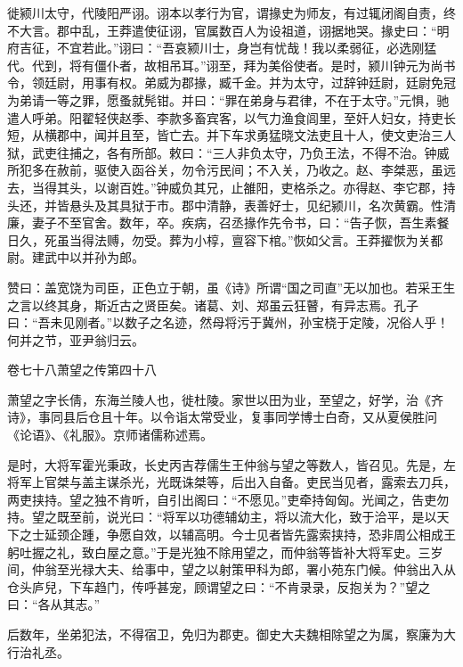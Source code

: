 \documentclass[12pt,UTF8]{ctexbook}
\begin{document}
徙颍川太守，代陵阳严诩。诩本以孝行为官，谓掾史为师友，有过辄闭阁自责，终不大言。郡中乱，王莽遣使征诩，官属数百人为设祖道，诩据地哭。掾史曰：“明府吉征，不宜若此。”诩曰：“吾哀颍川士，身岂有忧哉！我以柔弱征，必选刚猛代。代到，将有僵仆者，故相吊耳。”诩至，拜为美俗使者。是时，颍川钟元为尚书令，领廷尉，用事有权。弟威为郡掾，臧千金。并为太守，过辞钟廷尉，廷尉免冠为弟请一等之罪，愿蚤就髡钳。并曰：“罪在弟身与君律，不在于太守。”元惧，驰遣人呼弟。阳翟轻侠赵季、李款多畜宾客，以气力渔食闾里，至奸人妇女，持吏长短，从横郡中，闻并且至，皆亡去。并下车求勇猛晓文法吏且十人，使文吏治三人狱，武吏往捕之，各有所部。敕曰：“三人非负太守，乃负王法，不得不治。钟威所犯多在赦前，驱使入函谷关，勿令污民间；不入关，乃收之。赵、李桀恶，虽远去，当得其头，以谢百姓。”钟威负其兄，止雒阳，吏格杀之。亦得赵、李它郡，持头还，并皆悬头及其具狱于市。郡中清静，表善好士，见纪颍川，名次黄霸。性清廉，妻子不至官舍。数年，卒。疾病，召丞掾作先令书，曰：“告子恢，吾生素餐日久，死虽当得法赙，勿受。葬为小椁，亶容下棺。”恢如父言。王莽擢恢为关都尉。建武中以并孙为郎。



赞曰：盖宽饶为司臣，正色立于朝，虽《诗》所谓“国之司直”无以加也。若采王生之言以终其身，斯近古之贤臣矣。诸葛、刘、郑虽云狂瞽，有异志焉。孔子曰：“吾未见刚者。”以数子之名迹，然母将污于冀州，孙宝桡于定陵，况俗人乎！何并之节，亚尹翁归云。





卷七十八萧望之传第四十八



萧望之字长倩，东海兰陵人也，徙杜陵。家世以田为业，至望之，好学，治《齐诗》，事同县后仓且十年。以令诣太常受业，复事同学博士白奇，又从夏侯胜问《论语》、《礼服》。京师诸儒称述焉。



是时，大将军霍光秉政，长史丙吉荐儒生王仲翁与望之等数人，皆召见。先是，左将军上官桀与盖主谋杀光，光既诛桀等，后出入自备。吏民当见者，露索去刀兵，两吏挟持。望之独不肯听，自引出阁曰：“不愿见。”吏牵持匈匈。光闻之，告吏勿持。望之既至前，说光曰：“将军以功德辅幼主，将以流大化，致于洽平，是以天下之士延颈企踵，争愿自效，以辅高明。今士见者皆先露索挟持，恐非周公相成王躬吐握之礼，致白屋之意。”于是光独不除用望之，而仲翁等皆补大将军史。三岁间，仲翁至光禄大夫、给事中，望之以射策甲科为郎，署小苑东门候。仲翁出入从仓头庐兒，下车趋门，传呼甚宠，顾谓望之曰：“不肯录录，反抱关为？”望之曰：“各从其志。”



后数年，坐弟犯法，不得宿卫，免归为郡吏。御史大夫魏相除望之为属，察廉为大行治礼丞。
\end{document}
